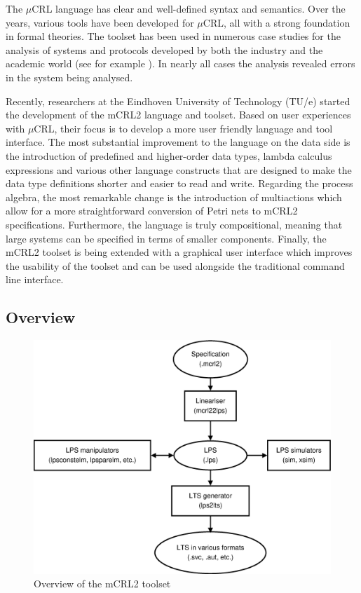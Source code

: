 \documentclass[a4paper,fleqn]{article}
\newcommand{\frm}[1]{\mbox{\ensuremath{#1}}}
\newcommand{\mCRL}{\frm{\mu}CRL\xspace}
\begin{document}
The \mCRL language has clear and well-defined syntax and semantics. Over the
years, various tools have been developed for \mCRL, all with a strong foundation
in formal theories. The toolset has been used in numerous case studies for the
analysis of systems and protocols developed by both the industry and the
academic world (see for example \cite{Fokkink et al 2004, Groote et al 2003,
Pang et al 2003}). In nearly all cases the analysis revealed errors in the
system being analysed.

Recently, researchers at the Eindhoven University of Technology (TU/e) started
the development of the mCRL2 language and toolset. Based on user experiences
with \mCRL, their focus is to develop a more user friendly language and tool
interface. The most substantial improvement to the language on the data side is
the introduction of predefined and higher-order data types, lambda calculus
expressions and various other language constructs that are designed to make the
data type definitions shorter and easier to read and write. Regarding the
process algebra, the most remarkable change is the introduction of multiactions
which allow for a more straightforward conversion of Petri nets to mCRL2
specifications. Furthermore, the language is truly compositional, meaning that
large systems can be specified in terms of smaller components. Finally, the
mCRL2 toolset is being extended with a graphical user interface which improves
the usability of the toolset and can be used alongside the traditional command
line interface.

\subsection{Overview}
\label{subsec:overview}

\begin{figure}[tbp]
\centering
  \includegraphics[scale=0.4]{mcrl2_toolset}
  \caption{Overview of the mCRL2 toolset}
  \label{fig:overview}
\end{figure}
\end{document}
